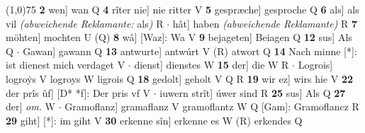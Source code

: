 \documentclass[8pt,a4paper,notitlepage]{article}
\begin{document}
\begin{table}[ht]
\begin{minipage}[t]{0.5\linewidth}
\line(1,0){75} \newline
\textbf{2} wen] wan Q \textbf{4} rîter nie] nie ritter V \textbf{5} gespræche] gesproche Q \textbf{6} als] als vil \textit{(abweichende Reklamante:} als\textit{)} R  $\cdot$ hât] haben \textit{(abweichende Reklamante)} R \textbf{7} möhten] mochten U (Q) \textbf{8} wâ] [Waz]: Wa V \textbf{9} bejageten] Beiagen Q \textbf{12} sus] Als Q  $\cdot$ Gawan] gawann Q \textbf{13} antwurte] antwúrt V (R) atwort Q \textbf{14} Nach minne [*]: ist dienest mich verdaget V  $\cdot$ dienst] dienstes W \textbf{15} der] die W R  $\cdot$ Logrois] logroẏs V logroys W ligrois Q \textbf{18} gedolt] geholt V Q R \textbf{19} wir ez] wirs hie V \textbf{22} der prîs ûf] [D* *f]: Der pris vf V  $\cdot$ iuwern strît] úwer sind R \textbf{25} sus] Als Q \textbf{27} der] \textit{om.} W  $\cdot$ Gramoflanz] gramaflanz V gramoflantz W Q [Gam]: Gramoflancz R \textbf{29} giht] [*]: im giht V \textbf{30} erkenne sîn] erkenne es W (R) erkendes Q \newline
\end{minipage}
\end{table}
\end{document}
